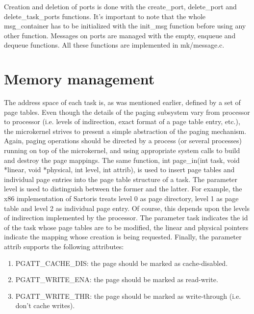 \documentclass[11pt, letterpaper, twoside, english]{book}
\begin{document}
Creation and deletion of ports is done with the \textsf{create\_port}, \textsf{delete\_port} and \textsf{delete\_task\_ports} functions. It's important to note that the whole \textsf{msg\_container} has to be initialized with the \textsf{init\_msg} function before using any other function. Messages on ports are managed with the \textsf{empty}, \textsf{enqueue} and \textsf{dequeue} functions. All these functions are implemented in \textsf{mk/message.c}.

\section{Memory management} \label{sec:memorymanagement}

The address space of each task is, as was mentioned earlier, defined by a set of page tables. Even though the details of the paging subsystem vary from processor to processor (i.e. levels of indirection, exact format of a page table entry, etc.), the microkernel strives to present a simple abstraction of the paging mechanism. Again, paging operations should be directed by a process (or several processes) running on top of the microkernel, and using appropriate system calls to build and destroy the page mappings. The same function, \textsf{int page\_in(int task, void *linear, void *physical, int level, int attrib)}, is used to insert page tables and individual page entries into the page table structure of a task. The parameter \textsf{level} is used to distinguish between the former and the latter. For example, the x86 implementation of Sartoris treats level 0 as page directory, level 1 as page table and level 2 as individual page entry. Of course, this depends upon the levels of indirection implemented by the processor. The parameter \textsf{task} indicates the id of the task whose page tables are to be modified, the \textsf{linear} and \textsf{physical} pointers indicate the mapping whose creation is being requested. Finally, the parameter \textsf{attrib} supports the following attributes:

\begin{enumerate}
\item[] \textsf{PGATT\_CACHE\_DIS}: the page should be marked as cache-disabled.
\item[] \textsf{PGATT\_WRITE\_ENA}: the page should be marked as read-write.
\item[] \textsf{PGATT\_WRITE\_THR}: the page should be marked as write-through (i.e. don't cache writes).
\end{enumerate}
\end{document}
